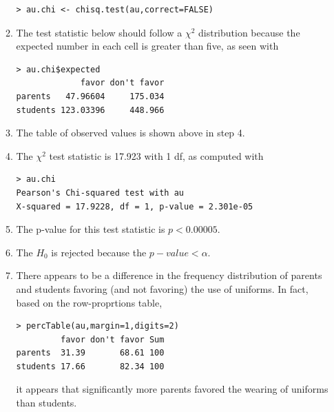 \documentclass[10pt,openany]{book}\usepackage[]{graphicx}\usepackage[]{color}
\makeatletter
\newenvironment{kframe}{%
 \def\at@end@of@kframe{}%
 \ifinner\ifhmode%
  \def\at@end@of@kframe{\end{minipage}}%
  \begin{minipage}{\columnwidth}%
 \fi\fi%
 \def\FrameCommand##1{\hskip\@totalleftmargin \hskip-\fboxsep
 \colorbox{shadecolor}{##1}\hskip-\fboxsep
     \hskip-\linewidth \hskip-\@totalleftmargin \hskip\columnwidth}%
 \MakeFramed {\advance\hsize-\width
   \@totalleftmargin\z@ \linewidth\hsize
   \@setminipage}}%
 {\par\unskip\endMakeFramed%
 \at@end@of@kframe}
\newenvironment{knitrout}{}{} %
\makeatother
\begin{document}
\begin{itemize}
\begin{enumerate}
\begin{knitrout}
\begin{kframe}
\begin{verbatim}
> au.chi <- chisq.test(au,correct=FALSE)
\end{verbatim}
\end{kframe}
\end{knitrout}
      \item The test statistic below should follow a $\chi^{2}$ distribution because the expected number in each cell is greater than five, as seen with
\begin{knitrout}
\color{fgcolor}\begin{kframe}
\begin{verbatim}
> au.chi$expected
             favor don't favor
parents   47.96604     175.034
students 123.03396     448.966
\end{verbatim}
\end{kframe}
\end{knitrout}
      \item The table of observed values is shown above in step 4.
      \item The $\chi^{2}$ test statistic is 17.923 with 1 df, as computed with
\begin{knitrout}
\color{fgcolor}\begin{kframe}
\begin{verbatim}
> au.chi
Pearson's Chi-squared test with au 
X-squared = 17.9228, df = 1, p-value = 2.301e-05
\end{verbatim}
\end{kframe}
\end{knitrout}
      \item The p-value for this test statistic is $p<0.00005$.
      \item The $H_{0}$ is rejected because the $p-value <\alpha$.
      \item There appears to be a difference in the frequency distribution of parents and students favoring (and not favoring) the use of uniforms.  In fact, based on the row-proprtions table,
\begin{knitrout}
\color{fgcolor}\begin{kframe}
\begin{verbatim}
> percTable(au,margin=1,digits=2)
         favor don't favor Sum
parents  31.39       68.61 100
students 17.66       82.34 100
\end{verbatim}
\end{kframe}
\end{knitrout}
it appears that significantly more parents favored the wearing of uniforms than students.

\end{enumerate}
\end{itemize}
\end{document}

